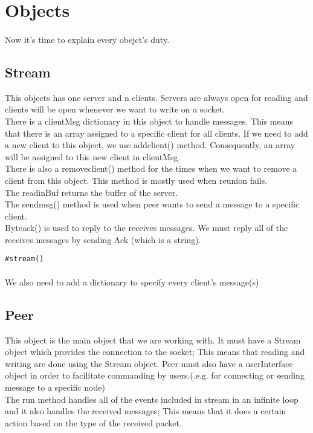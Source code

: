 \documentclass{article}
\begin{document}
\section{Objects}
\paragraph{}Now it's time to explain every obejct's duty.
\subsection{Stream}This objects has one server and n clients. Servers are always open for reading and clients will be open whenever we want to write on a socket. \\
There is a clientMsg dictionary in this object to handle messages. This means that there is an array assigned to a specific client for all clients. If we need to add a new client to this object, we use add\underline{\hspace{.05in}}client() method. Consequently, an array will be assigned to this new client in clientMsg.\\
There is also a remove\underline{\hspace{.05in}}client() method for the times when we want to remove a client from this object. This method is mostly used  when reunion fails.\\
The read\underline{\hspace{.05in}}inBuf returns the buffer of the server.\\
The send\underline{\hspace{.05in}}msg() method is used when peer wants to send a message to a specific client.\\
Byte\underline{\hspace{.05in}}ack() is used to reply to the receives messages. We must reply all of the receives messages by sending Ack (which is a string).\\
\begin{lstlisting}
#stream()

\end{lstlisting}
\paragraph{}We also need to add a dictionary to specify every client's message(s)
\subsection{Peer}This object is the main object that we are working with. It must have a Stream object which provides the connection to the socket; This means that reading and writing are done using the Stream object. Peer must also have a userInterface object in order to facilitate commanding by users.(.e.g. for connecting or sending message to a specific node)\\
The run method handles all of the events included in stream in an infinite loop and it also handles the received messages; This means that it does a certain action based on the type of the received packet.
\end{document}

